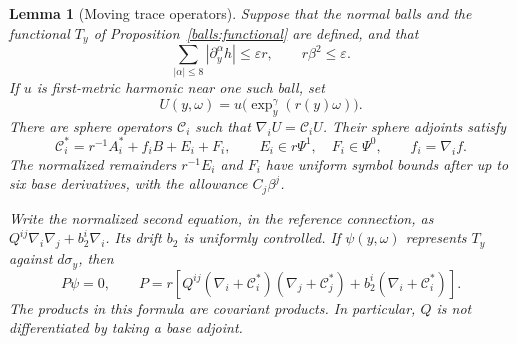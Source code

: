 \documentclass[11pt]{article}
\newtheorem{lemma}[theorem]{Lemma}
\theoremstyle{definition}
\theoremstyle{remark}
\newcommand{\eps}{\varepsilon}
\numberwithin{equation}{section}
\begin{document}
\begin{lemma}[Moving trace operators]\label{angular:trace}
Suppose that the normal balls and the functional $T_y$ of
Proposition~\ref{balls:functional} are defined, and that
\begin{equation}\label{angular:smallness}
 \sum_{|\alpha|\le8}|\partial_y^\alpha h|\le\eps r,
 \qquad r\beta^2\le\eps.
\end{equation}
If $u$ is first-metric harmonic near one such ball, set
\[
 U(y,\omega)=u\bigl(\exp_y^\gamma(r(y)\omega)\bigr).
\]
There are sphere operators $\mathcal C_i$ such that
$\nabla_iU=\mathcal C_iU$.  Their sphere adjoints satisfy
\begin{equation}\label{angular:C-expansion}
 \mathcal C_i^*=r^{-1}A_i^*+f_iB+E_i+F_i,
 \qquad E_i\in r\Psi^1,\quad F_i\in\Psi^0,
 \qquad f_i=\nabla_i f.
\end{equation}
The normalized remainders $r^{-1}E_i$ and $F_i$ have uniform symbol
bounds after up to six base derivatives, with the allowance $C_j\beta^j$.

Write the normalized second equation, in the reference connection, as
$Q^{ij}\nabla_i\nabla_j+b_2^i\nabla_i$.  Its drift $b_2$ is uniformly
controlled.  If $\psi(y,\omega)$ represents $T_y$ against $d\sigma_y$,
then
\begin{equation}\label{angular:P-equation}
 P\psi=0,\qquad
 P=r\left[Q^{ij}(\nabla_i+\mathcal C_i^*)
                    (\nabla_j+\mathcal C_j^*)
             +b_2^i(\nabla_i+\mathcal C_i^*)\right].
\end{equation}
The products in this formula are covariant products.  In particular,
$Q$ is not differentiated by taking a base adjoint.
\end{lemma}
\end{document}
